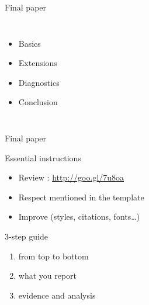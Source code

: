 \documentclass[t]{beamer}
\begin{document}
\begin{frame}[t]{Final paper}
\begin{columns}[T]
	\begin{itemize}
		\item Basics
		\item Extensions
		\item Diagnostics
		\item Conclusion
	\end{itemize}
	\\[.5em]
	\end{columns}
	
	\end{frame}
	
	\begin{frame}[t]{Final paper}

		\begin{block}{Essential instructions}

			\begin{itemize}
				\item Review : \url{http://goo.gl/7u8oa}
				\item Respect  mentioned in the template
				\item Improve  (styles, citations, fonts…)
			\end{itemize}
			
		\end{block}

		\begin{block}{3-step guide}

			\begin{enumerate}
				\item {} from top to bottom
				\item {} what you report
				\item {} evidence and analysis
			\end{enumerate}

		\end{block}
					
	\end{frame}
\end{document}
